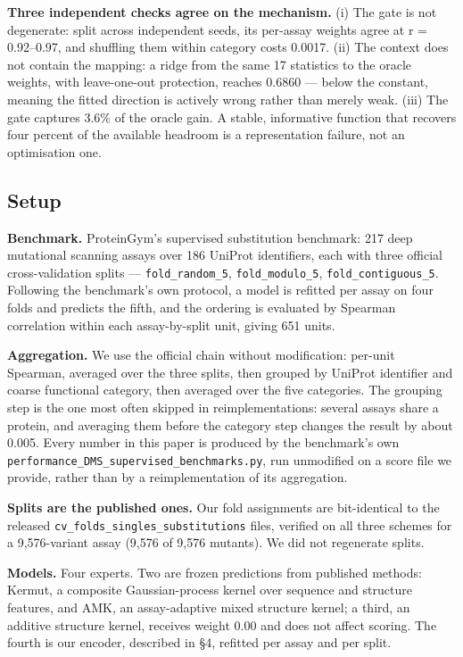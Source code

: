 \documentclass[sigconf,review,nonacm]{acmart}
\begin{document}
\textbf{Three independent checks agree on the mechanism.} (i) The gate is not degenerate: split across
independent seeds, its per-assay weights agree at r = 0.92--0.97, and shuffling them within category
costs 0.0017. (ii) The context does not contain the mapping: a ridge from the same 17 statistics to the
oracle weights, with leave-one-out protection, reaches 0.6860 --- below the constant, meaning the fitted
direction is actively wrong rather than merely weak. (iii) The gate captures 3.6\% of the oracle gain.
A stable, informative function that recovers four percent of the available headroom is a representation
failure, not an optimisation one.

\subsection{Setup}\label{setup}

\textbf{Benchmark.} ProteinGym's \cite{proteingym} supervised substitution benchmark: 217 deep mutational scanning assays over
186 UniProt identifiers, each with three official cross-validation splits --- \texttt{fold\_random\_5},
\texttt{fold\_modulo\_5}, \texttt{fold\_contiguous\_5}. Following the benchmark's own protocol, a model is refitted per
assay on four folds and predicts the fifth, and the ordering is evaluated by Spearman correlation
within each assay-by-split unit, giving 651 units.

\textbf{Aggregation.} We use the official chain without modification: per-unit Spearman, averaged over the
three splits, then grouped by UniProt identifier and coarse functional category, then averaged over the
five categories. The grouping step is the one most often skipped in reimplementations: several assays
share a protein, and averaging them before the category step changes the result by about 0.005. Every
number in this paper is produced by the benchmark's own
\texttt{performance\_DMS\_supervised\_benchmarks.py}, run unmodified on a score file we provide, rather than by a
reimplementation of its aggregation.

\textbf{Splits are the published ones.} Our fold assignments are bit-identical to the released
\texttt{cv\_folds\_singles\_substitutions} files, verified on all three schemes for a 9,576-variant assay
(9,576 of 9,576 mutants). We did not regenerate splits.

\textbf{Models.} Four experts. Two are frozen predictions from published methods: Kermut, a composite
Gaussian-process kernel over sequence and structure features, and AMK, an assay-adaptive mixed structure
kernel; a third, an additive structure kernel, receives weight 0.00 and does not affect scoring. The
fourth is our encoder, described in §4, refitted per assay and per split.
\end{document}
